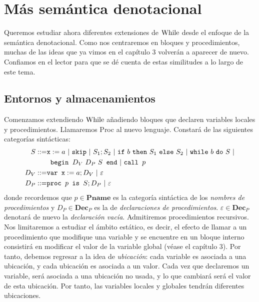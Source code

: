\cleardoublepage
\chapter{Más semántica denotacional}


Queremos estudiar ahora diferentes extensiones de $\mathrm{While}$ desde el enfoque de la semántica denotacional. Como nos centraremos en bloques y procedimientos, muchas de las ideas que ya vimos en el capítulo 3 volverán a aparecer de nuevo. Confiamos en el lector para que se dé cuenta de estas similitudes a lo largo de este tema.

\section{Entornos y almacenamientos}

Comenzamos extendiendo $\mathrm{While}$ añadiendo bloques que declaren variables locales y procedimientos. Llamaremos Proc al nuevo lenguaje. Constará de las siguientes categorías sintácticas:
\begin{align*}
        S ::= &\n{x}:=a\ |\ \n{skip}\ |\ S_1;S_2\ |\ \n{if}\ b\ \n{then}\ S_1\ \n{else}\ S_2\ |\ \n{while}\ b\ \n{do}\ S \ |\\ & \n{ begin }D_V\ D_P\ S\n{ end}\ |\ \n{call }p \\
    D_V ::= &\n{var x} := a; D_V\ |\ \varepsilon \\
    D_P ::= &\n{proc }p\n{ is }S; D_P\ |\ \varepsilon
\end{align*}
donde recordemos que $p \in \mathbf{Pname}$ es la categoría sintáctica de los \textit{nombres de procedimientos} y $D_P \in \mathbf{Dec}_P$ es la de \textit{declaraciones de procedimientos}. $\varepsilon\in \mathbf{Dec}_P$ denotará de nuevo la \textit{declaración vacía}. Admitiremos procedimientos recursivos. 
\\

Nos limitaremos a estudiar el ámbito estático, es decir, el efecto de llamar a un procedimiento que modifique una variable y se encuentre en un bloque interno consistirá en modificar el valor de la variable global (véase el capítulo 3). Por tanto, debemos regresar a la idea de \textit{ubicación}: cada variable es asociada a una ubicación, y cada ubicación es asociada a un valor. Cada vez que declaremos un variable, será asociada a una ubicación no usada, y lo que cambiará será el valor de esta ubicación. Por tanto, las variables locales y globales tendrán diferentes ubicaciones.
\\


